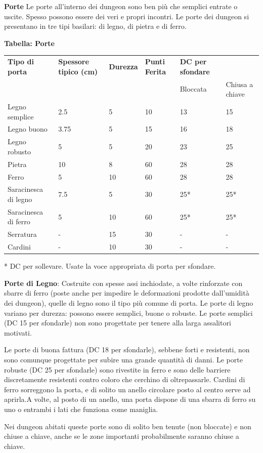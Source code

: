 \documentclass[a4paper,11pt,twoside,openany]{book}
\begin{document}
{\textbf{Porte} Le porte all'interno dei dungeon sono ben più che semplici entrate o uscite. Spesso possono essere dei veri e propri incontri. Le porte dei dungeon si presentano in tre tipi basilari: di legno, di pietra e di ferro.

\bigskip

\textbf{Tabella: Porte}

\bigskip

\begin{tabular}{L{2.5cm} L{3cm} L{2cm} L{2cm}L{2cm}L{2cm} } 
\toprule
\textbf{Tipo di porta} & \textbf{Spessore tipico (cm)} & \textbf{Durezza} & \textbf{Punti Ferita} & \textbf{DC per sfondare} & \tabularnewline
& & & & Bloccata & Chiusa a chiave\tabularnewline
Legno semplice & 2.5 & 5 & 10 & 13 & 15\tabularnewline
Legno buono & 3.75 & 5 & 15 & 16 & 18\tabularnewline
Legno robusto & 5 & 5 & 20 & 23 & 25\tabularnewline
Pietra & 10 & 8 & 60 & 28 & 28\tabularnewline
Ferro & 5 & 10 & 60 & 28 & 28\tabularnewline
Saracinesca di legno & 7.5 & 5 & 30 & 25{*} & 25{*}\tabularnewline
Saracinesca di ferro & 5 & 10 & 60 & 25{*} & 25{*}\tabularnewline
Serratura & - & 15 & 30 & - & -\tabularnewline
Cardini & - & 10 & 30 & - & -\tabularnewline
\end{tabular}

{*} DC per sollevare. Usate la voce appropriata di porta per sfondare.

\bigskip

\textbf{Porte di Legno}: Costruite con spesse assi inchiodate, a volte rinforzate con sbarre di ferro (poste anche per impedire le deformazioni prodotte dall'umidità dei dungeon), quelle di legno sono il tipo più comune di porta. Le porte di legno variano per durezza: possono essere semplici, buone o robuste. Le porte semplici (DC 15 per sfondarle) non sono progettate per tenere alla larga assalitori motivati.

Le porte di buona fattura (DC 18 per sfondarle), sebbene forti e resistenti, non sono comunque progettate per subire una grande quantità di danni. Le porte robuste (DC 25 per sfondarle) sono rivestite in ferro e sono delle barriere discretamente resistenti contro coloro che cerchino di oltrepassarle. Cardini di ferro sorreggono la porta, e di solito un anello circolare posto al centro serve ad aprirla.A volte, al posto di un anello, una porta dispone di una sbarra di ferro su uno o entrambi i lati che funziona come maniglia.

Nei dungeon abitati queste porte sono di solito ben tenute (non bloccate) e non chiuse a chiave, anche se le zone importanti probabilmente saranno chiuse a chiave.

}
\end{document}
